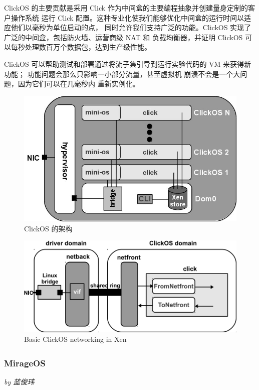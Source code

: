 \documentclass[UTF8,fontset=none,linespread=1.15]{ctexart}
\let\nosupcite\cite
\renewcommand*{\cite}[1]{\textsuperscript{\nosupcite{#1}}}
\newcommand{\sectionauthor}[1]{%
\vspace*{-5ex}
\noindent\textrm{\hfill\textit{by #1}}
\vspace*{3ex}\par}
\begin{document}
ClickOS 的主要贡献是采用 Click 作为中间盒的主要编程抽象并创建量身定制的客户操作系统
运行 Click 配置。这种专业化使我们能够优化中间盒的运行时间以适应他们以毫秒为单位启动的点，
同时允许我们支持广泛的功能。ClickOS 实现了广泛的中间盒，包括防火墙、运营商级 NAT 和
负载均衡器，并证明 ClickOS 可以每秒处理数百万个数据包，达到生产级性能。

ClickOS 可以帮助测试和部署通过将流子集引导到运行实验代码的 VM 来获得新功能；
功能问题会那么只影响一小部分流量，甚至虚拟机 崩溃不会是一个大问题，因为它们可以在几毫秒内
重新实例化。

\begin{figure}[H]
\includegraphics[width=\linewidth]{pictures/clickOS_arch.jpg}
\caption{ClickOS 的架构}
\end{figure}
\begin{figure}[H]
\includegraphics[width=\linewidth]{pictures/ClickOS_networking.png}
\caption{Basic ClickOS networking in Xen}
\end{figure}

\subsubsection[MirageOS]{MirageOS\cite{bib:11-unikerel2}}\sectionauthor{蓝俊玮}
\end{document}
